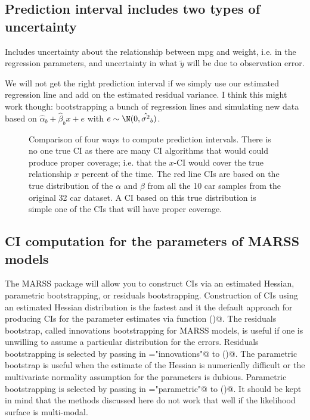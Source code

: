 \subsection{Prediction interval includes two types of uncertainty}

Includes uncertainty about the relationship between mpg and weight, i.e. in the regression parameters, and uncertainty in what $\tilde{y}$ will be due to observation error.

We will not get the right prediction interval if we simply use our estimated regression line and add on the estimated residual variance.  I think this might work though: bootstrapping a bunch of regression lines and simulating new data based on $\hat{\alpha}_b + \hat{\beta}_b x + e$ with $e\sim \N(0,\hat{\sigma^2}_b)$.

\begin{figure}[htp]
\begin{center}
\end{center}
\caption{Comparison of four ways to compute prediction intervals.  There is no one true CI as there are many CI algorithms that would could produce proper coverage; i.e. that the $x$-CI would cover the true relationship $x$ percent of the time.  The red line CIs are based on the true distribution of the $\alpha$ and $\beta$ from all the 10 car samples from the original 32 car dataset.  A CI based on this true distribution is simple one of the CIs that will have proper coverage.}
\label{fig:PIs}
\end{figure}


\subsection{CI computation for the parameters of MARSS models}

The MARSS package will allow you to construct CIs via an estimated Hessian, parametric bootstrapping, or residuals bootstrapping.   Construction of CIs using an estimated Hessian distribution is the fastest and it the default approach for producing CIs for the parameter estimates  via function \verb@MARSSparamCIs()@.   The residuals bootstrap, called innovations bootstrapping for MARSS models, is useful if one is unwilling to assume a particular distribution for the errors. Residuals bootstrapping is selected by passing in \verb@method="innovations"@ to  \verb@MARSSparamCIs()@.  The parametric bootstrap is useful when the estimate of the Hessian is numerically difficult or the multivariate normality assumption for the parameters is dubious. Parametric bootstrapping is selected by passing in \verb@method="parametric"@ to  \verb@MARSSparamCIs()@. It should be kept in mind that the methods discussed here do not work that well if the likelihood surface is multi-modal.

